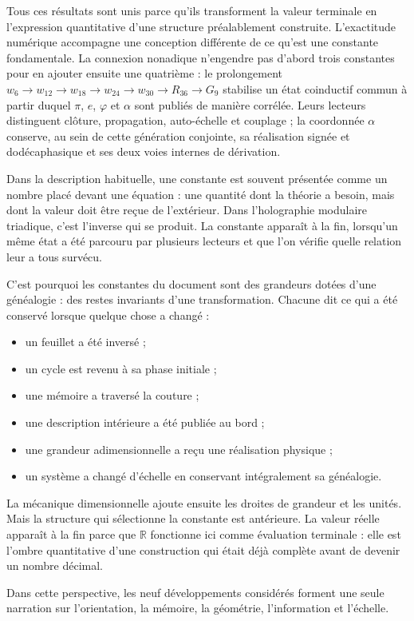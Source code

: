 Tous ces résultats sont unis parce qu’ils transforment la valeur terminale en l’expression quantitative d’une structure préalablement construite. L’exactitude numérique accompagne une conception différente de ce qu’est une constante fondamentale. La connexion nonadique n’engendre pas d’abord trois constantes pour en ajouter ensuite une quatrième : le prolongement \(w_6\to w_{12}\to w_{18}\to w_{24}\to w_{30}\to R_{36}\to G_9\) stabilise un état coinductif commun à partir duquel \(\pi\), \(e\), \(\varphi\) et \(\alpha\) sont publiés de manière corrélée. Leurs lecteurs distinguent clôture, propagation, auto-échelle et couplage ; la coordonnée \(\alpha\) conserve, au sein de cette génération conjointe, sa réalisation signée et dodécaphasique et ses deux voies internes de dérivation.\par

Dans la description habituelle, une constante est souvent présentée comme un nombre placé devant une équation : une quantité dont la théorie a besoin, mais dont la valeur doit être reçue de l’extérieur. Dans l’holographie modulaire triadique, c’est l’inverse qui se produit. La constante apparaît à la fin, lorsqu’un même état a été parcouru par plusieurs lecteurs et que l’on vérifie quelle relation leur a tous survécu.\par

C’est pourquoi les constantes du document sont des grandeurs dotées d’une généalogie : des restes invariants d’une transformation. Chacune dit ce qui a été conservé lorsque quelque chose a changé :\par

\begin{itemize}[leftmargin=*,itemsep=0.35em]
\item un feuillet a été inversé ;
\item un cycle est revenu à sa phase initiale ;
\item une mémoire a traversé la couture ;
\item une description intérieure a été publiée au bord ;
\item une grandeur adimensionnelle a reçu une réalisation physique ;
\item un système a changé d’échelle en conservant intégralement sa généalogie.
\end{itemize}

La mécanique dimensionnelle ajoute ensuite les droites de grandeur et les unités. Mais la structure qui sélectionne la constante est antérieure. La valeur réelle apparaît à la fin parce que \(\mathbb R\) fonctionne ici comme évaluation terminale : elle est l’ombre quantitative d’une construction qui était déjà complète avant de devenir un nombre décimal.\par

Dans cette perspective, les neuf développements considérés forment une seule narration sur l’orientation, la mémoire, la géométrie, l’information et l’échelle.\par
